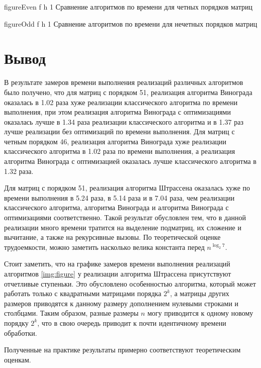 {figureEven} %
{f} %
{h} %
{1\textwidth} %
{Сравнение алгоритмов по времени для четных порядков матриц} %

{figureOdd} %
{f} %
{h} %
{1\textwidth} %
{Сравнение алгоритмов по времени для нечетных порядков матриц} %


\clearpage

\section*{Вывод}

В результате замеров времени выполнения реализаций различных алгоритмов было получено, что для матриц с порядком 51, реализация алгоритма Винограда оказалась в 1.02 раза хуже реализации классического алгоритма по времени выполнения, при этом реализация алгоритма Винограда с оптимизациями оказалась лучше в 1.34 раза реализации классического алгоритма и в 1.37 раз лучше реализации без оптимизаций по времени выполнения. 
Для матриц с четным порядком 46, реализация алгоритма Винограда хуже реализации классического алгоритма в 1.02 раза по времени выполнения, а реализация алгоритма Винограда с оптимизацией оказалась лучше классического алгоритма в 1.32 раза. 

Для матриц с порядком 51, реализация алгоритма Штрассена оказалась хуже по времени выполнения в 5.24 раза, в 5.14 раза и в 7.04 раза, чем реализации классического алгоритма, алгоритма Винограда и алгоритма Винограда с оптимизациями соответственно. 
Такой результат обусловлен тем, что в данной реализации много времени тратится на выделение подматриц, их сложение и вычитание, а также на рекурсивные вызовы. По теоретической оценке трудоемкости, можно заметить насколько велика константа перед $n^{\log_{2}7}$.

Стоит заметить, что на графике замеров времени выполнения реализаций алгоритмов \ref{img:figure} у реализации алгоритма Штрассена присутствуют отчетливые ступеньки.
Это обусловлено особенностью алгоритма, который может работать только с квадратными матрицами порядка $2^k$, а матрицы других размеров приводятся к данному размеру дополнением нулевыми строками и столбцами. 
Таким образом, разные размеры $n$ могу приводится к одному новому порядку $2^k$, что в свою очередь приводит к почти идентичному времени обработки.

Полученные на практике результаты примерно соответствуют теоретическим оценкам.